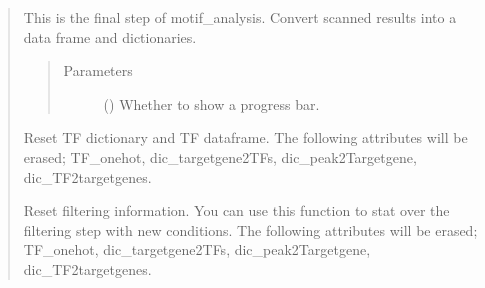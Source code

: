\documentclass[letterpaper,10pt,english]{sphinxmanual}
\begin{document}
\begin{quote}
\begin{fulllineitems}

\begin{fulllineitems}
\label{\detokenize{modules/celloracle.motif_analysis:celloracle.motif_analysis.TFinfo.make_TFinfo_dataframe_and_dictionary}}
This is the final step of motif\_analysis.
Convert scanned results into a data frame and dictionaries.
\begin{quote}\begin{description}
\item[{Parameters}] \leavevmode
{} () \textendash{} Whether to show a progress bar.

\end{description}\end{quote}

\end{fulllineitems}


\begin{fulllineitems}
\label{\detokenize{modules/celloracle.motif_analysis:celloracle.motif_analysis.TFinfo.reset_dictionary_and_df}}
Reset TF dictionary and TF dataframe.
The following attributes will be erased; TF\_onehot, dic\_targetgene2TFs, dic\_peak2Targetgene, dic\_TF2targetgenes.

\end{fulllineitems}


\begin{fulllineitems}
\label{\detokenize{modules/celloracle.motif_analysis:celloracle.motif_analysis.TFinfo.reset_filtering}}
Reset filtering information.
You can use this function to stat over the filtering step with new conditions.
The following attributes will be erased; TF\_onehot, dic\_targetgene2TFs, dic\_peak2Targetgene, dic\_TF2targetgenes.

\end{fulllineitems}


\end{fulllineitems}
\end{quote}
\end{document}
